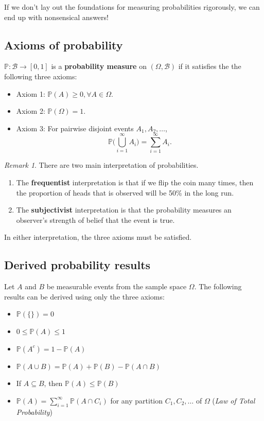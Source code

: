 \documentclass[
]{book}
\providecommand{\tightlist}{%
  \setlength{\itemsep}{0pt}\setlength{\parskip}{0pt}}
\newcommand{\bbP}{\mathbb{P}}
\newcommand{\cB}{{\mathcal B}}
\theoremstyle{definition}
\theoremstyle{definition}
\theoremstyle{definition}
\theoremstyle{definition}
\theoremstyle{remark}
\newtheorem*{remark}{Remark}
\begin{document}
If we don't lay out the foundations for measuring probabilities rigorously, we can end up with nonsensical answers!

\hypertarget{axioms-of-probability}{%
\subsection{Axioms of probability}\label{axioms-of-probability}}

\(\bbP:\cB\to[0,1]\) is a \textbf{probability measure} on \((\Omega, \cB)\) if it satisfies the the following three axioms:

\begin{itemize}
\tightlist
\item
  Axiom 1: \(\bbP(A) \geq 0, \forall A \in \Omega\).
\item
  Axiom 2: \(\bbP(\Omega) = 1\).
\item
  Axiom 3: For pairwise disjoint events \(A_1,A_2,\dots\),
  \[
  \bbP\bigg( \bigcup_{i=1}^\infty A_i  \bigg) = \sum_{i=1}^\infty A_i.
  \]
\end{itemize}

\begin{remark}
There are two main interpretation of probabilities.

\begin{enumerate}
\def\labelenumi{\arabic{enumi}.}
\item
  The \textbf{frequentist} interpretation is that if we flip the coin many times, then the proportion of heads that is observed will be 50\% in the long run.
\item
  The \textbf{subjectivist} interpretation is that the probability measures an observer's strength of belief that the event is true.
\end{enumerate}

In either interpretation, the three axioms must be satisfied.
\end{remark}

\hypertarget{derived-probability-results}{%
\subsection{Derived probability results}\label{derived-probability-results}}

Let \(A\) and \(B\) be measurable events from the sample space \(\Omega\).
The following results can be derived using only the three axioms:

\begin{itemize}
\tightlist
\item
  \(\bbP(\{ \}) = 0\)
\item
  \(0\leq\bbP(A)\leq 1\)
\item
  \(\bbP(A^c)=1-\bbP(A)\)
\item
  \(\bbP(A \cup B) = \bbP(A) + \bbP(B) - \bbP(A \cap B)\)
\item
  If \(A \subseteq B\), then \(\bbP(A) \leq \bbP(B)\)
\item
  \(\bbP(A) = \sum_{i=1}^\infty \bbP(A \cap C_i)\) for any partition \(C_1,C_2,\dots\) of \(\Omega\) (\emph{Law of Total Probability})
\end{itemize}
\end{document}
